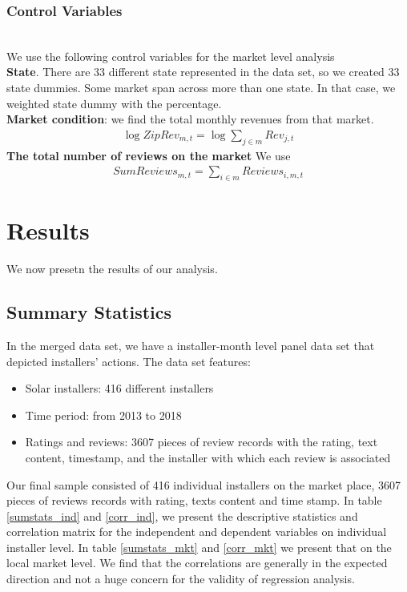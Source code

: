 \documentclass[msom,blindrev]{informs3}
\begin{document}
\subsubsection{Control Variables}\hfill\\
We use the following control variables for the market level analysis\\
\textbf{State}. There are 33 different state represented in the data set, so we created 33 state dummies. Some market span across more than one state. In that case, we weighted state dummy with the percentage. \\
\textbf{Market condition}:
we find the total monthly revenues from that market.
\begin{align*}
\log ZipRev_{m,t}=\log \sum_{j\in m}Rev_{j,t}
\end{align*}
 \textbf{The total number of reviews on the market } We use
\begin{align*}
SumReviews_{m,t}=\sum_{i\in m} Reviews_{i,m,t}
\end{align*}


\section{Results}
We now presetn the results of our analysis.
\subsection{Summary Statistics}
In the merged data set, we have a installer-month level panel data set that depicted installers' actions. The data set features:
\begin{itemize}
\item Solar installers: 416 different installers
\item Time period: from 2013 to 2018
\item Ratings and reviews: 3607 pieces of review records with the rating, text content, timestamp, and the installer with which each review is associated
\end{itemize}
Our final sample consisted of 416 individual installers on the market place, 3607 pieces of reviews records with rating, texts content and time stamp. In table \ref{sumstats_ind} and \ref{corr_ind}, we present the descriptive statistics and correlation matrix for the independent and dependent variables on individual installer level.  In table \ref{sumstats_mkt} and \ref{corr_mkt} we present that on the local market level. We find that the correlations are generally in the expected direction and not a huge concern for the validity of regression analysis.




\end{document}
